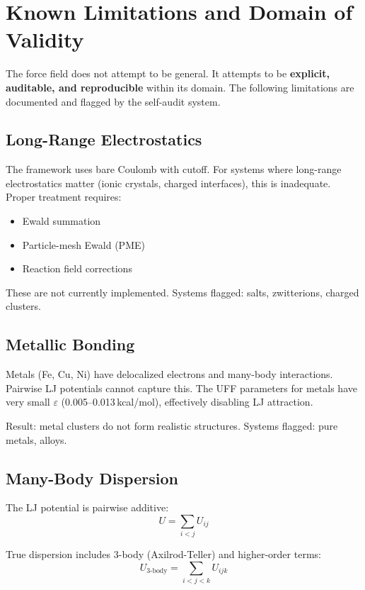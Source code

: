 \documentclass[11pt]{article}
\begin{document}
\section{Known Limitations and Domain of Validity}

The force field does not attempt to be general. It attempts to be \textbf{explicit, auditable, and reproducible} within its domain. The following limitations are documented and flagged by the self-audit system.

\subsection{Long-Range Electrostatics}

The framework uses bare Coulomb with cutoff. For systems where long-range electrostatics matter (ionic crystals, charged interfaces), this is inadequate. Proper treatment requires:
\begin{itemize}
\item Ewald summation
\item Particle-mesh Ewald (PME)
\item Reaction field corrections
\end{itemize}

These are not currently implemented. Systems flagged: salts, zwitterions, charged clusters.

\subsection{Metallic Bonding}

Metals (Fe, Cu, Ni) have delocalized electrons and many-body interactions. Pairwise LJ potentials cannot capture this. The UFF parameters for metals have very small $\varepsilon$ (0.005–0.013\,kcal/mol), effectively disabling LJ attraction.

Result: metal clusters do not form realistic structures. Systems flagged: pure metals, alloys.

\subsection{Many-Body Dispersion}

The LJ potential is pairwise additive:
\begin{equation}
U = \sum_{i<j} U_{ij}
\end{equation}

True dispersion includes 3-body (Axilrod-Teller) and higher-order terms:
\begin{equation}
U_{\text{3-body}} = \sum_{i<j<k} U_{ijk}
\end{equation}
\end{document}
